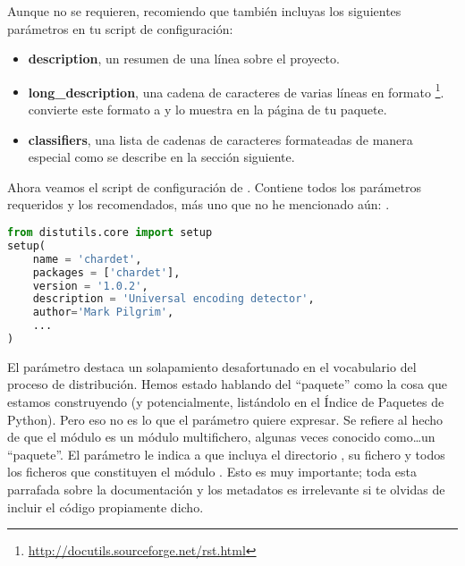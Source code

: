 Aunque no se requieren, recomiendo que también incluyas los siguientes parámetros en tu script de configuración:

\begin{itemize}
  \item \textbf{description}, un resumen de una línea sobre el proyecto.
  \item \textbf{long\_description}, una cadena de caracteres de varias líneas en formato \footnote{\href{http://docutils.sourceforge.net/rst.html}{http://docutils.sourceforge.net/rst.html}}.  convierte este formato a  y lo muestra en la página de tu paquete.
  \item \textbf{classifiers}, una lista de cadenas de caracteres formateadas de manera especial como se describe en la sección siguiente.
\end{itemize}


Ahora veamos el script de configuración de . Contiene todos los parámetros requeridos y los recomendados, más uno que no he mencionado aún: .


\begin{lstlisting}[language=Python,breaklines=true]
from distutils.core import setup
setup(
    name = 'chardet',
    packages = ['chardet'],
    version = '1.0.2',
    description = 'Universal encoding detector',
    author='Mark Pilgrim',
    ...
)
\end{lstlisting}

El parámetro  destaca un solapamiento desafortunado en el vocabulario del proceso de distribución. Hemos estado hablando del ``paquete'' como la cosa que estamos construyendo (y potencialmente, listándolo en el Índice de Paquetes de Python). Pero eso no es lo que el parámetro  quiere expresar. Se refiere al hecho de que el módulo  es un módulo multifichero, algunas veces conocido como\ldots un ``paquete''. El parámetro  le indica a  que incluya el directorio , su fichero  y todos los ficheros  que constituyen el módulo . Esto es muy importante; toda esta parrafada sobre la documentación y los metadatos es irrelevante si te olvidas de incluir el código propiamente dicho.

